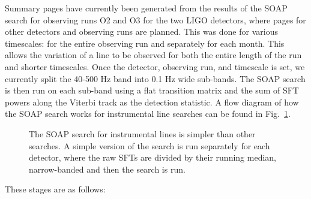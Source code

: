 Summary pages have currently been generated from the results of the SOAP search for observing runs O2 and O3 for
the two \gls{LIGO} detectors, where pages for other detectors and observing runs are planned. This was done for various timescales: for the
entire observing run and separately for each month.  This allows the variation
of a line to be observed for both the entire length of the run and shorter timescales. Once the detector, observing
run, and timescale is
set, we currently split the 40-500 Hz band into 0.1 Hz wide sub-bands.  
The SOAP search is then run on each sub-band using a flat transition matrix and the sum of \gls{SFT} powers along the Viterbi track as the detection 
statistic.
A flow diagram of how the SOAP search works for instrumental line searches can
be found in Fig.~\ref{detchar:summary:flow}.
%
%
\begin{figure}[hp]
	\centering
	
	
	\caption[Flow diagram for SOAP line search.]{\label{detchar:summary:flow} The SOAP search for instrumental lines is simpler than other searches. A simple version of the search is run separately for each detector, where the raw \glspl{SFT} are divided by their running median, narrow-banded and then the search is run. }
	
\end{figure} 
These stages are as follows:
